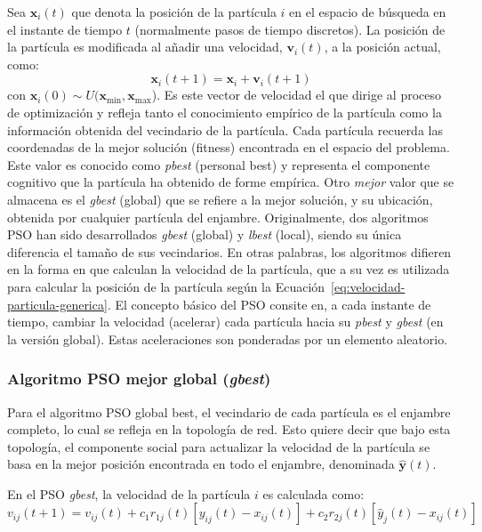 \documentclass{article}
\begin{document}
Sea $\mathbf{x}_i(t)$ que denota la posición de la partícula $i$ en el espacio de búsqueda en el instante de tiempo $t$ (normalmente pasos de tiempo discretos).
La posición de la partícula es modificada al añadir una velocidad, $\mathbf{v}_i(t)$, a la posición actual, como:
\begin{equation}
	\mathbf{x}_i(t+1) = \mathbf{x}_i + \mathbf{v}_i(t+1)
	\label{eq:velocidad-particula-generica}
\end{equation}
con $\mathbf{x}_i(0) \sim U(\mathbf{x}_\text{min},\mathbf{x}_\text{max}$).
Es este vector de velocidad el que dirige al proceso de optimización y refleja tanto el conocimiento empírico de la partícula como la información obtenida del vecindario de la partícula.
Cada partícula recuerda las coordenadas de la mejor solución (fitness) encontrada en el espacio del problema. 
Este valor es conocido como \emph{pbest} (personal best) y representa el componente cognitivo que la partícula ha obtenido de forme empírica.
Otro \emph{mejor} valor que se almacena es el \emph{gbest} (global) que se refiere a la mejor solución, y su ubicación, obtenida por cualquier partícula del enjambre.
Originalmente, dos algoritmos PSO han sido desarrollados \emph{gbest} (global) y \emph{lbest} (local), siendo su única diferencia el tamaño de sus vecindarios.
En otras palabras, los algoritmos difieren en la forma en que calculan la velocidad de la partícula, que a su vez es utilizada para calcular la posición de la partícula según la Ecuación~\ref{eq:velocidad-particula-generica}.
El concepto básico del PSO consite en, a cada instante de tiempo, cambiar la velocidad (acelerar) cada partícula hacia su \emph{pbest} y \emph{gbest} (en la versión global).
Estas aceleraciones son ponderadas por un elemento aleatorio.


\subsubsection{Algoritmo PSO mejor global (\emph{gbest})}
Para el algoritmo PSO global best, el vecindario de cada partícula es el enjambre completo, lo cual se refleja en la topología de red.
Esto quiere decir que bajo esta topología, el componente social para actualizar la velocidad de la partícula se basa en la mejor posición encontrada en todo el enjambre, denominada $\mathbf{\hat{y}}(t)$.

En el PSO \emph{gbest}, la velocidad de la partícula $i$ es calculada como:
\begin{equation}
	v_{ij}(t+1) = v_{ij}(t) + c_1r_{1j}(t)[y_{ij}(t) - x_{ij}(t)] + c_2 r_{2j}(t)[\hat{y}_j(t) - x_{ij}(t)]
	\label{eq:velocidad-gbest}
\end{equation}
	
\end{document}
